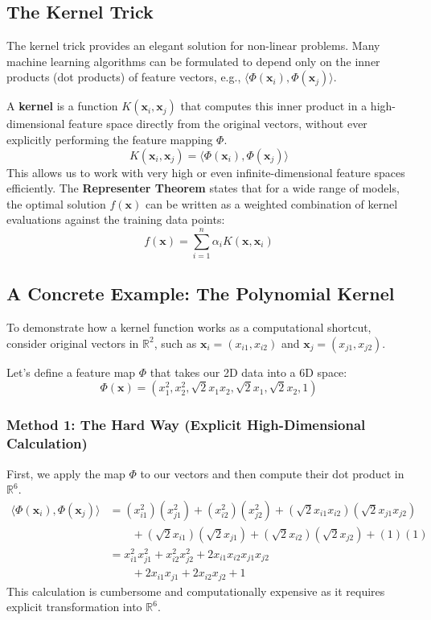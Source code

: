 \documentclass{article}
\begin{document}
\begin{multicols}{2}
	\section{The Kernel Trick}
	The kernel trick provides an elegant solution for non-linear problems. Many machine learning algorithms can be formulated to depend only on the inner products (dot products) of feature vectors, e.g., $\langle \Phi(\mathbf{x}_i), \Phi(\mathbf{x}_j) \rangle$.

	A \textbf{kernel} is a function $K(\mathbf{x}_i, \mathbf{x}_j)$ that computes this inner product in a high-dimensional feature space directly from the original vectors, without ever explicitly performing the feature mapping $\Phi$.
	$$
		K(\mathbf{x}_i, \mathbf{x}_j) = \langle \Phi(\mathbf{x}_i), \Phi(\mathbf{x}_j) \rangle
	$$
	This allows us to work with very high or even infinite-dimensional feature spaces efficiently. The \textbf{Representer Theorem} states that for a wide range of models, the optimal solution $f(\mathbf{x})$ can be written as a weighted combination of kernel evaluations against the training data points:
	$$
		f(\mathbf{x}) = \sum_{i=1}^{n} \alpha_i K(\mathbf{x}, \mathbf{x}_i)
	$$

	\subsection{A Concrete Example: The Polynomial Kernel}
	To demonstrate how a kernel function works as a computational shortcut, consider original vectors in $\mathbb{R}^2$, such as $\mathbf{x}_i = (x_{i1}, x_{i2})$ and $\mathbf{x}_j = (x_{j1}, x_{j2})$.

	Let's define a feature map $\Phi$ that takes our 2D data into a 6D space:
	$$\Phi(\mathbf{x}) = (x_1^2, x_2^2, \sqrt{2}x_1x_2, \sqrt{2}x_1, \sqrt{2}x_2, 1)$$

	\subsubsection{Method 1: The Hard Way (Explicit High-Dimensional Calculation)}
	First, we apply the map $\Phi$ to our vectors and then compute their dot product in $\mathbb{R}^6$.
	\begin{align*}
		\langle \Phi(\mathbf{x}_i), \Phi(\mathbf{x}_j) \rangle
		 & = (x_{i1}^2)(x_{j1}^2) + (x_{i2}^2)(x_{j2}^2) + (\sqrt{2}x_{i1}x_{i2})(\sqrt{2}x_{j1}x_{j2}) \\
		 & \qquad + (\sqrt{2}x_{i1})(\sqrt{2}x_{j1}) + (\sqrt{2}x_{i2})(\sqrt{2}x_{j2}) + (1)(1)        \\
		 & = x_{i1}^2x_{j1}^2 + x_{i2}^2x_{j2}^2 + 2x_{i1}x_{i2}x_{j1}x_{j2}                            \\
		 & \qquad + 2x_{i1}x_{j1} + 2x_{i2}x_{j2} + 1
	\end{align*}
	This calculation is cumbersome and computationally expensive as it requires explicit transformation into $\mathbb{R}^6$.


\end{multicols}
\end{document}

